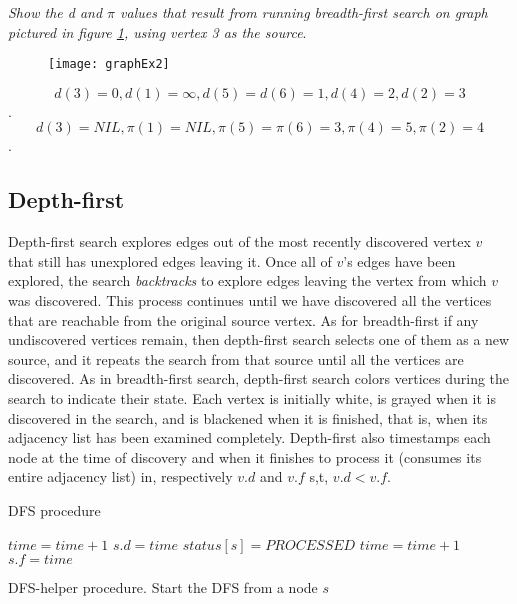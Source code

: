 \begin{problem}
\textit{Show the d and $\pi$ values that result from running breadth-first search on graph pictured in figure \ref{fig:graphex2}, using vertex 3 as the source}.


	\begin{figure}
	\label{fig:graphex2}
	\centering
		\texttt{[image: graphEx2]}
	\end{figure}
\begin{solution}
\[d(3) = 0 , d(1) = \infty , d(5) = d(6) = 1 , d(4) = 2 ,d(2) = 3\].
\[d(3) = NIL , \pi(1) = NIL , \pi(5) = \pi(6) = 3 , \pi(4) = 5 ,\pi(2) = 4\].
	\end{solution}
\end{problem}



\subsection{Depth-first}
Depth-first search explores edges out of the most recently discovered vertex $v$ that still has unexplored edges leaving it.
Once all of $v$'s edges have been explored, the search \textit{backtracks} to explore edges
leaving the vertex from which $v$ was discovered. This process continues until we
have discovered all the vertices that are reachable from the original source vertex.
As for breadth-first if any undiscovered vertices remain, then depth-first search selects one of them as
a new source, and it repeats the search from that source until all the vertices are discovered.
As in breadth-first search, depth-first search colors vertices during the search to
indicate their state. Each vertex is initially white, is grayed when it is discovered
in the search, and is blackened when it is finished, that is, when its adjacency list
has been examined completely.
Depth-first also timestamps each node at the time of discovery and when it finishes to process it (consumes its entire adjacency list) in, respectively $v.d$ and $v.f$ s,t, $v.d < v.f$.

\begin{algorithm}
\caption{DFS procedure}
\end{algorithm}


\begin{algorithm}

$time = time +1$\;
$s.d = time$ 
 $status[s] = PROCESSED$\;
 $time = time +1$\;
 $s.f = time$\;
\caption{DFS-helper procedure. Start the DFS from a node $s$}
\end{algorithm}


